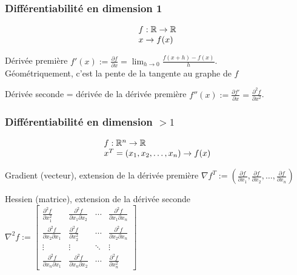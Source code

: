 \documentclass{beamer}
\newcommand{\R}{{\ensuremath\mathbb{R}}}
\begin{document}

\begin{frame}
  \frametitle{Différentiabilité en dimension 1}

  \[
  \begin{array}{l}
    f: \R \rightarrow \R \\
    x \rightarrow f(x)
  \end{array}
  \]
  
  \begin{block}{Dérivée première}
    $f'(x) := \frac{\partial f}{\partial x} = \lim_{h \rightarrow 0} \frac{f(x+h) - f(x)}{h}$.\\
    Géométriquement, c'est la pente de la tangente au graphe de $f$ 
  \end{block}

  \begin{block}{Dérivée seconde = dérivée de la dérivée première}
    $f''(x) := \frac{\partial f'}{\partial x} = \frac{\partial ^{2}f}{\partial x^{2}}$.
  \end{block}

  
\end{frame}

\begin{frame}
  \frametitle{Différentiabilité en dimension $> 1$}

  \[
  \begin{array}{l}
    f: \R^n \rightarrow \R \\
    x^T = (x_1,x_2,\dots,x_n) \rightarrow f(x)
  \end{array}
  \]
  
  \begin{block}{Gradient (vecteur), extension de la dérivée première}
    ${\nabla f}^T := (\frac{\partial f}{\partial x_1}, \frac{\partial f}{\partial x_2}, \dots, \frac{\partial f}{\partial x_n})$
  \end{block}

    \begin{block}{Hessien (matrice), extension de la dérivée seconde}
      $\nabla^2 f :=
      \begin{bmatrix}{\frac {\partial ^{2}f}{\partial x_{1}^{2}}}&{\frac {\partial ^{2}f}{\partial x_{1}\partial x_{2}}}&\cdots &{\frac {\partial ^{2}f}{\partial x_{1}\partial x_{n}}}\\{\frac {\partial ^{2}f}{\partial x_{2}\partial x_{1}}}&{\frac {\partial ^{2}f}{\partial x_{2}^{2}}}&\cdots &{\frac {\partial ^{2}f}{\partial x_{2}\partial x_{n}}}\\\vdots &\vdots &\ddots &\vdots \\{\frac {\partial ^{2}f}{\partial x_{n}\partial x_{1}}}&{\frac {\partial ^{2}f}{\partial x_{n}\partial x_{2}}}&\cdots &{\frac {\partial ^{2}f}{\partial x_{n}^{2}}}\end{bmatrix}$
  \end{block}

\end{frame}
\end{document}
